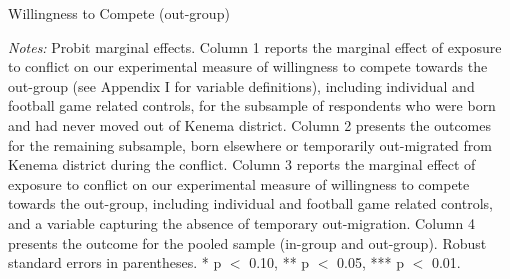 \clearpage

\begin{threeparttable}[tp]
	\caption{Willingness to Compete (out-group)}
	\label{tab:slf:compete}
	\centering
	\tiny
	
	\begin{tablenotes}
		\item \textit{Notes:} Probit marginal effects. Column 1 reports the marginal effect of exposure to conflict on our experimental measure of willingness to compete towards the out-group (see Appendix I for variable definitions), including individual and football game related controls, for the subsample of respondents who were born and had never moved out of Kenema district. Column 2 presents the outcomes for the remaining subsample, born elsewhere or temporarily out-migrated from Kenema district during the conflict. Column 3 reports the marginal effect of exposure to conflict on our experimental measure of willingness to compete towards the out-group, including individual and football game related controls, and a variable capturing the absence of temporary out-migration. Column 4 presents the outcome for the pooled sample (in-group and out-group). Robust standard errors in parentheses. * p $<$ 0.10, ** p $<$ 0.05, *** p $<$ 0.01.
		\item
	\end{tablenotes}
\end{threeparttable}

